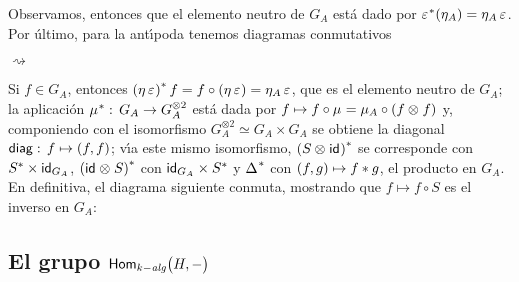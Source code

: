 Observamos, entonces que el elemento neutro de $G_A$ est\'{a} dado por
$\pull\counidad(\unidad[A])=\unidad[A]\,\counidad$. Por \'{u}ltimo, para la
ant\'{\i}poda tenemos diagramas conmutativos
\begin{center}
	$\rightsquigarrow$
\end{center}
Si $f\in G_A$, entonces
\begin{math}
	\pull{(\unidad\,\counidad)}\,f=f\circ(\unidad\,\counidad)=
		\unidad[A]\,\counidad
\end{math}, que es el elemento neutro de $G_A$; la aplicaci\'{o}n
$\pull\producto:\,G_A\rightarrow G_A^{\otimes 2}$ est\'{a} dada por
$f\mapsto f\circ\producto=\producto[A]\circ(f\tensor f)$ y, componiendo con el
isomorfismo $G_A^{\otimes 2}\simeq G_A\times G_A$ se obtiene la diagonal
$\diag:\,f\mapsto (f,f)$; v\'{\i}a este mismo isomorfismo,
$\pull{(S\tensor\id)}$ se corresponde con $\pull S\times\id[G_A]$,
$\pull{(\id\tensor S)}$ con $\id[G_A]\times\pull S$ y $\pull\coproducto$ con
$(f,g)\mapsto f\convol g$, el producto en $G_A$. En definitiva, el diagrama
siguiente conmuta, mostrando que $f\mapsto f\circ S$ es el inverso en $G_A$:
\begin{center}
\end{center}

\subsection{El grupo $\Homalg\big(H,-\big)$}%
	\label{subsec:gruposafines:elgrupodemorfismos}

